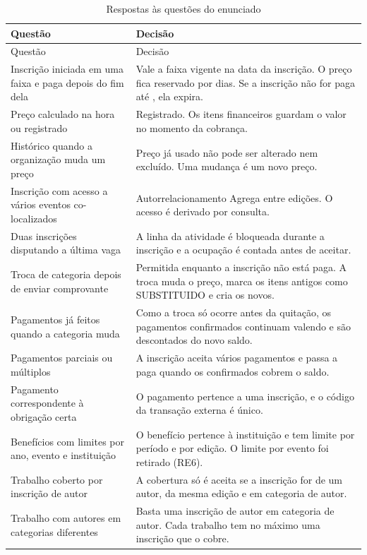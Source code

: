 \begin{longtable}{@{}L{5.6cm} L{8.7cm}@{}}
\caption{Respostas às questões do enunciado}\label{tab:questoes}\\
\toprule
Questão & Decisão\\
\midrule
\endfirsthead
\toprule
Questão & Decisão\\
\midrule
\endhead
\bottomrule
\endfoot
Inscrição iniciada em uma faixa e paga depois do fim dela & Vale a faixa vigente na data da inscrição. O preço fica reservado por  dias. Se a inscrição não for paga até , ela expira.\\
Preço calculado na hora ou registrado & Registrado. Os itens financeiros guardam o valor no momento da cobrança.\\
Histórico quando a organização muda um preço & Preço já usado não pode ser alterado nem excluído. Uma mudança é um novo preço.\\
Inscrição com acesso a vários eventos co-localizados & Autorrelacionamento Agrega entre edições. O acesso é derivado por consulta.\\
Duas inscrições disputando a última vaga & A linha da atividade é bloqueada durante a inscrição e a ocupação é contada antes de aceitar.\\
Troca de categoria depois de enviar comprovante & Permitida enquanto a inscrição não está paga. A troca muda o preço, marca os itens antigos como SUBSTITUIDO e cria os novos.\\
Pagamentos já feitos quando a categoria muda & Como a troca só ocorre antes da quitação, os pagamentos confirmados continuam valendo e são descontados do novo saldo.\\
Pagamentos parciais ou múltiplos & A inscrição aceita vários pagamentos e passa a paga quando os confirmados cobrem o saldo.\\
Pagamento correspondente à obrigação certa & O pagamento pertence a uma inscrição, e o código da transação externa é único.\\
Benefícios com limites por ano, evento e instituição & O benefício pertence à instituição e tem limite por período e por edição. O limite por evento foi retirado (RE6).\\
Trabalho coberto por inscrição de autor & A cobertura só é aceita se a inscrição for de um autor, da mesma edição e em categoria de autor.\\
Trabalho com autores em categorias diferentes & Basta uma inscrição de autor em categoria de autor. Cada trabalho tem no máximo uma inscrição que o cobre.\\

\end{longtable}
